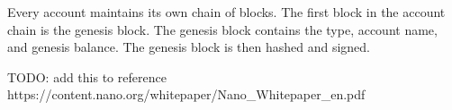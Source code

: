 Every account maintains its own chain of blocks. The first block in the account
chain is the genesis block. The genesis block contains the type, account name,
and genesis balance. The genesis block is then hashed and signed.



TODO: add this to reference\newline
https://content.nano.org/whitepaper/Nano\_Whitepaper\_en.pdf




% 
